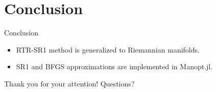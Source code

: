 \documentclass{beamer}
\begin{document}
\section{Conclusion}

\begin{frame}{Conclusion}
    \begin{itemize}
        \item RTR-SR1 method is generalized to Riemannian manifolds.
        \item SR1 and BFGS approximations are implemented in Manopt.jl.
    \end{itemize}
    \begin{center}
        Thank you for your attention! Questions? 
    \end{center}
\end{frame}
\end{document}
